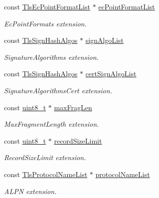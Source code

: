 \begin{DoxyCompactItemize}
const \hyperlink{tls_8h_a56cd71342730891de1eb587381a26731}{Tls\+Ec\+Point\+Format\+List} $\ast$ \hyperlink{structTlsHelloExtensions_aeea7fd9313f97525e78c56a722b0dcfd}{ec\+Point\+Format\+List}
\begin{DoxyCompactList}\small\item\em Ec\+Point\+Formats extension. \end{DoxyCompactList}\item 
const \hyperlink{tls_8h_a52f8ea223987ee1e857b6687f38d3888}{Tls\+Sign\+Hash\+Algos} $\ast$ \hyperlink{structTlsHelloExtensions_a7903ad9cf319d5f27990432c4e719544}{sign\+Algo\+List}
\begin{DoxyCompactList}\small\item\em Signature\+Algorithms extension. \end{DoxyCompactList}\item 
const \hyperlink{tls_8h_a52f8ea223987ee1e857b6687f38d3888}{Tls\+Sign\+Hash\+Algos} $\ast$ \hyperlink{structTlsHelloExtensions_a640637c05b8aec2ef15420d5005830cb}{cert\+Sign\+Algo\+List}
\begin{DoxyCompactList}\small\item\em Signature\+Algorithms\+Cert extension. \end{DoxyCompactList}\item 
const \hyperlink{stdint_8h_aba7bc1797add20fe3efdf37ced1182c5}{uint8\+\_\+t} $\ast$ \hyperlink{structTlsHelloExtensions_a45f3337429c669574aaedfcc6a1a2d23}{max\+Frag\+Len}
\begin{DoxyCompactList}\small\item\em Max\+Fragment\+Length extension. \end{DoxyCompactList}\item 
const \hyperlink{stdint_8h_aba7bc1797add20fe3efdf37ced1182c5}{uint8\+\_\+t} $\ast$ \hyperlink{structTlsHelloExtensions_a35167138c60de81d1635fc1d87fc3b8f}{record\+Size\+Limit}
\begin{DoxyCompactList}\small\item\em Record\+Size\+Limit extension. \end{DoxyCompactList}\item 
const \hyperlink{tls_8h_a437df336a6795a38ec9bcfb7c2ab4b2f}{Tls\+Protocol\+Name\+List} $\ast$ \hyperlink{structTlsHelloExtensions_a0752d52c09a933f5b001385db60159b1}{protocol\+Name\+List}
\begin{DoxyCompactList}\small\item\em A\+L\+PN extension. \end{DoxyCompactList}\item 

\end{DoxyCompactItemize}
